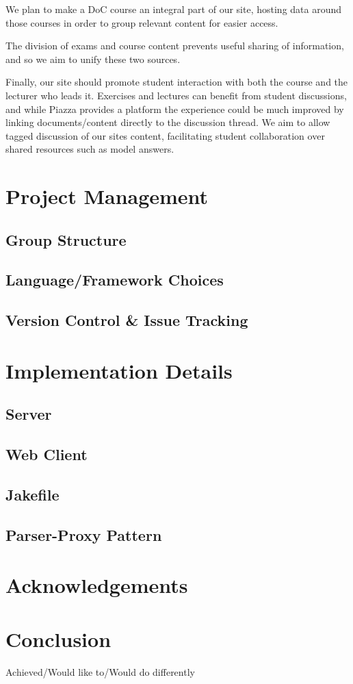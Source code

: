 \documentclass[a4paper]{article}
\begin{document}
We plan to make a DoC course an integral part of our site, hosting data around those courses in order to group relevant content for easier access.

The division of exams and course content prevents useful sharing of information, and so we aim to unify these two sources.

Finally, our site should promote student interaction with both the course and the lecturer who leads it. Exercises and lectures can benefit from student discussions, and while Piazza provides a platform the experience could be much improved by linking documents/content directly to the discussion thread. We aim to allow tagged discussion of our sites content, facilitating student collaboration over shared resources such as model answers.


\section{Project Management}

\subsection{Group Structure}
\subsection{Language/Framework Choices}
\subsection{Version Control \& Issue Tracking}

\section{Implementation Details}

\subsection{Server}

\subsection{Web Client}

\subsection{Jakefile}

\subsection{Parser-Proxy Pattern}

\section{Acknowledgements}

\section{Conclusion}

Achieved/Would like to/Would do differently
\end{document}
